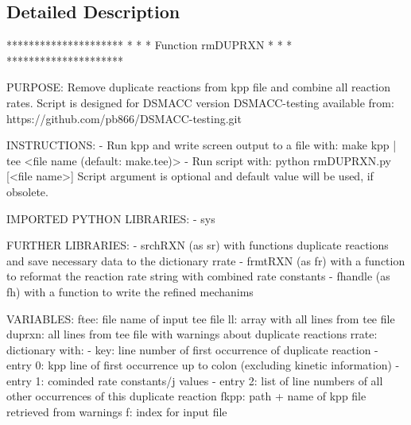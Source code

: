 \subsection{Detailed Description}
\begin{DoxyVerb}*********************
*                   *
* Function rmDUPRXN *
*                   *
*********************

PURPOSE:
Remove duplicate reactions from kpp file and combine all reaction rates.
Script is designed for DSMACC version DSMACC-testing available from:
https://github.com/pb866/DSMACC-testing.git

INSTRUCTIONS:
- Run kpp and write screen output to a file with:
  make kpp | tee <file name (default: make.tee)>
- Run script with:
  python rmDUPRXN.py [<file name>]
  Script argument is optional and default value will be used,
  if obsolete.

IMPORTED PYTHON LIBRARIES:
- sys

FURTHER LIBRARIES:
- srchRXN (as sr) with functions duplicate reactions and save
                  necessary data to the dictionary rrate
- frmtRXN (as fr) with a function to reformat the reaction rate string
                  with combined rate constants
- fhandle (as fh) with a function to write the refined mechanims

VARIABLES:
ftee:   file name of input tee file
ll:     array with all lines from tee file
duprxn: all lines from tee file with warnings about duplicate reactions
rrate:  dictionary with:
        - key:      line number of first occurrence of duplicate reaction
        - entry 0:  kpp line of first occurrence up to colon
                    (excluding kinetic information)
        - entry 1:  cominded rate constants/j values
        - entry 2:  list of line numbers of all other occurrences of
                    this duplicate reaction
fkpp:   path + name of kpp file retrieved from warnings
f:      index for input file
\end{DoxyVerb}
 